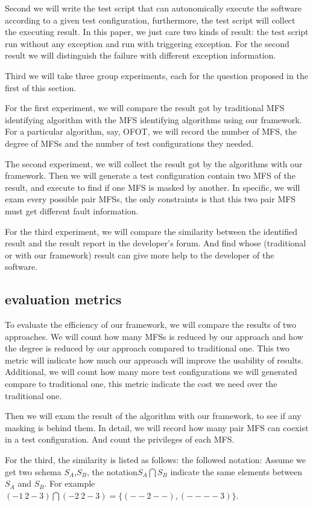 \documentclass{sig-alternate}
\begin{document}
Second we will write the test script that can autonomically execute the software according to a given test configuration, furthermore, the test script will collect the executing result. In this paper, we just care two kinds of result: the test script run without any exception and run with triggering exception. For the second result we will distinguish the failure with different exception information.

Third we will take three group experiments, each for the question proposed in the first of this section.

For the first experiment, we will compare the result got by traditional MFS identifying algorithm with the MFS identifying algorithms using our framework. For a particular algorithm, say, OFOT, we will record the number of MFS, the degree of MFSs and the number of test configurations they needed.

The second experiment, we will collect the result got by the algorithms with our framework. Then we will generate a test configuration contain two MFS of the result, and execute to find if one MFS is masked by another. In specific, we will exam every possible pair MFSs, the only constraints is that this two pair MFS must get different fault information.

For the third experiment, we will compare the similarity between the identified result and the result report in the developer's forum. And find whose (traditional or with our framework) result can give more help to the developer of the software.

\subsection{evaluation metrics}
To evaluate the efficiency of our framework, we will compare the results of two approaches. We will count how many MFSs is reduced by our approach and how the degree is reduced by our approach compared to traditional one. This two metric will indicate how much our approach will improve the usability of results.  Additional, we will count how many more test configurations we will generated compare to traditional one, this metric indicate the cost we need over the traditional one.

Then we will exam the result of the algorithm with our framework, to see if any masking is behind them. In detail, we will record how many pair MFS can coexist in a test configuration. And count the privileges of each MFS.

For the third, the similarity is listed as follows:
the followed notation:
Assume we get two schema $S_{A}$,$S_{B}$, the notation$S_{A} \bigcap S_{B}$ indicate the same elements between $S_{A}$ and $S_{B}$. For example $(- 1\ 2 - 3) \bigcap  (- 2\ 2 - 3) = \{ (- - 2 - -) , (- - - - 3)\}$.
\end{document}
